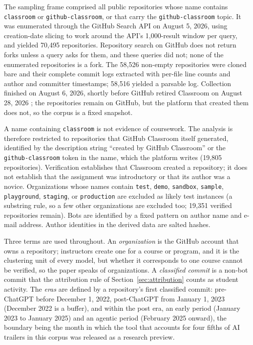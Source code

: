 \documentclass[acmsmall,screen,review,anonymous]{acmart}
\begin{document}
The sampling frame comprised all public repositories whose name contains \texttt{classroom} or \texttt{github-classroom}, or that carry the \texttt{github-classroom} topic. It was enumerated through the GitHub Search API on August 5, 2026, using creation-date slicing to work around the API's 1,000-result window per query, and yielded 70,495 repositories. Repository search on GitHub does not return forks unless a query asks for them, and these queries did not; none of the enumerated repositories is a fork. The 58,526 non-empty repositories were cloned bare and their complete commit logs extracted with per-file line counts and author and committer timestamps; 58,516 yielded a parsable log. Collection finished on August 6, 2026, shortly before GitHub retired Classroom on August 28, 2026 \citep{github2026classroomdeprecated}; the repositories remain on GitHub, but the platform that created them does not, so the corpus is a fixed snapshot.

A name containing \texttt{classroom} is not evidence of coursework. The analysis is therefore restricted to repositories that GitHub Classroom itself generated, identified by the description string ``created by GitHub Classroom'' or the \texttt{github-classroom} token in the name, which the platform writes (19,805 repositories). Verification establishes that Classroom created a repository; it does not establish that the assignment was introductory or that its author was a novice. Organizations whose names contain \texttt{test}, \texttt{demo}, \texttt{sandbox}, \texttt{sample}, \texttt{playground}, \texttt{staging}, or \texttt{production} are excluded as likely test instances (a substring rule, so a few other organizations are excluded too; 19,351 verified repositories remain). Bots are identified by a fixed pattern on author name and e-mail address. Author identities in the derived data are salted hashes.

Three terms are used throughout. An \textit{organization} is the GitHub account that owns a repository; instructors create one for a course or program, and it is the clustering unit of every model, but whether it corresponds to one course cannot be verified, so the paper speaks of organizations. A \textit{classified commit} is a non-bot commit that the attribution rule of Section~\ref{sec:attribution} counts as student activity. The \textit{eras} are defined by a repository's first classified commit: pre-ChatGPT before December 1, 2022, post-ChatGPT from January 1, 2023 (December 2022 is a buffer), and within the post era, an early period (January 2023 to January 2025) and an agentic period (February 2025 onward), the boundary being the month in which the tool that accounts for four fifths of AI trailers in this corpus was released as a research preview.
\end{document}
